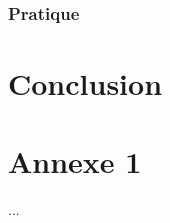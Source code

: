 \documentclass[a4paper,11pt,twoside]{report}
\begin{document}
\subsection{Pratique}

\chapter{Conclusion}

  
\nocite{*} 

%
\cleardoublepage

\appendix

\chapter{Annexe 1}
...
\end{document}
